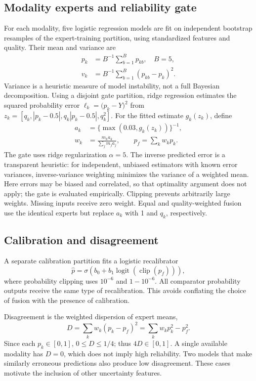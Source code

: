 \documentclass[conference]{IEEEtran}
\begin{document}
\subsection{Modality experts and reliability gate}
For each modality, five logistic regression models are fit on independent bootstrap resamples of the expert-training partition, using standardized features and quality. Their mean and variance are
\begin{align}
p_k &= B^{-1}\sum_{b=1}^{B}p_{kb},\quad B=5,\\
v_k &= B^{-1}\sum_{b=1}^{B}(p_{kb}-p_k)^2.
\end{align}
Variance is a heuristic measure of model instability, not a full Bayesian decomposition. Using a disjoint gate partition, ridge regression estimates the squared probability error $\ell_k=\bigl(p_k-Y\bigr)^2$ from $z_k=[q_k,|p_k-0.5|,q_k|p_k-0.5|,q_k^2]$. For the fitted estimate $g_k(z_k)$, define
\begin{align}
a_k&=\{\max(0.03,g_k(z_k))\}^{-1},\\
w_k&=\frac{m_ka_k}{\sum_j m_ja_j},\qquad p_f=\sum_kw_kp_k.
\end{align}
The gate uses ridge regularization $\alpha=5$. The inverse predicted error is a transparent heuristic: for independent, unbiased estimators with known error variances, inverse-variance weighting minimizes the variance of a weighted mean. Here errors may be biased and correlated, so that optimality argument does not apply; the gate is evaluated empirically. Clipping prevents arbitrarily large weights. Missing inputs receive zero weight. Equal and quality-weighted fusion use the identical experts but replace $a_k$ with 1 and $q_k$, respectively.
\subsection{Calibration and disagreement}
A separate calibration partition fits a logistic recalibrator
\begin{equation}
\hat p=\sigma(b_0+b_1\operatorname{logit}(\operatorname{clip}(p_f))),
\end{equation}
where probability clipping uses $10^{-6}$ and $1-10^{-6}$. All comparator probability outputs receive the same type of recalibration. This avoids conflating the choice of fusion with the presence of calibration.

Disagreement is the weighted dispersion of expert means,
\begin{equation}
D=\sum_kw_k(p_k-p_f)^2=\sum_kw_kp_k^2-p_f^2.
\end{equation}
Since each $p_k\in[0,1]$, $0\leq D\leq1/4$; thus $4D\in[0,1]$. A single available modality has $D=0$, which does not imply high reliability. Two models that make similarly erroneous predictions also produce low disagreement. These cases motivate the inclusion of other uncertainty features.
\end{document}
